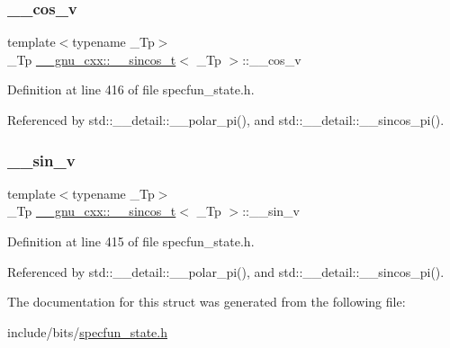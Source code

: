 \subsubsection{\texorpdfstring{\+\_\+\+\_\+cos\+\_\+v}{\_\_cos\_v}}
{\footnotesize\ttfamily template$<$typename \+\_\+\+Tp$>$ \\
\+\_\+\+Tp \hyperlink{struct____gnu__cxx_1_1____sincos__t}{\+\_\+\+\_\+gnu\+\_\+cxx\+::\+\_\+\+\_\+sincos\+\_\+t}$<$ \+\_\+\+Tp $>$\+::\+\_\+\+\_\+cos\+\_\+v}



Definition at line 416 of file specfun\+\_\+state.\+h.



Referenced by std\+::\+\_\+\+\_\+detail\+::\+\_\+\+\_\+polar\+\_\+pi(), and std\+::\+\_\+\+\_\+detail\+::\+\_\+\+\_\+sincos\+\_\+pi().

\mbox{\label{struct____gnu__cxx_1_1____sincos__t_a22a21d9a5658097549cbca39b891fd27}} 
\subsubsection{\texorpdfstring{\+\_\+\+\_\+sin\+\_\+v}{\_\_sin\_v}}
{\footnotesize\ttfamily template$<$typename \+\_\+\+Tp$>$ \\
\+\_\+\+Tp \hyperlink{struct____gnu__cxx_1_1____sincos__t}{\+\_\+\+\_\+gnu\+\_\+cxx\+::\+\_\+\+\_\+sincos\+\_\+t}$<$ \+\_\+\+Tp $>$\+::\+\_\+\+\_\+sin\+\_\+v}



Definition at line 415 of file specfun\+\_\+state.\+h.



Referenced by std\+::\+\_\+\+\_\+detail\+::\+\_\+\+\_\+polar\+\_\+pi(), and std\+::\+\_\+\+\_\+detail\+::\+\_\+\+\_\+sincos\+\_\+pi().



The documentation for this struct was generated from the following file\+:\begin{DoxyCompactItemize}
\item 
include/bits/\hyperlink{specfun__state_8h}{specfun\+\_\+state.\+h}\end{DoxyCompactItemize}
